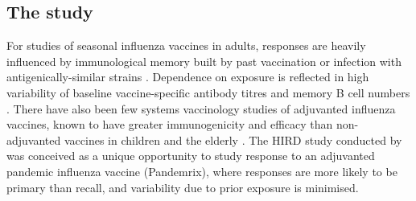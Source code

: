 %

\subsection{The  study}

For studies of seasonal influenza vaccines in adults, responses are heavily influenced by immunological memory built by past vaccination or infection with antigenically-similar strains \autocite{nakaya2012SystemsVaccinologyLearning,sobolev2016AdjuvantedInfluenzaH1N1Vaccination}.
Dependence on exposure is reflected in high variability of baseline vaccine-specific antibody titres and memory B cell numbers \autocite{tsang2014GlobalAnalysesHuman}.
There have also been few systems vaccinology studies of adjuvanted influenza vaccines, known to have greater immunogenicity and efficacy than non-adjuvanted vaccines in children and the elderly \autocite{nakaya2016SystemsBiologyImmunity, wilkins2017AS03MF59AdjuvantedInfluenza,tregoning2018AdjuvantedInfluenzaVaccines}.
The \gls{HIRD} study conducted by \textcite{sobolev2016AdjuvantedInfluenzaH1N1Vaccination} was conceived 
as a unique opportunity to study response to an adjuvanted pandemic influenza vaccine (Pandemrix),
where responses are more likely to be primary than recall,
and variability due to prior exposure is minimised.

